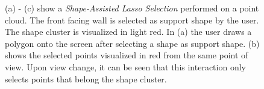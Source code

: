 \begin{figure}
\centering
{}\par\medskip
{}\par\medskip        
{}
\caption[Screenshots of the workflow of a Shape-Assisted Lasso Selection. (a) shows the lasso and the support shape, (b) the selected points, (c) shows that only points are selected on the support shape.]
{(a) - (c) show a \textit{Shape-Assisted Lasso Selection} performed on a point cloud. The front facing wall is selected as support shape by the user. The shape cluster is visualized in light red. In (a) the user draws a polygon onto the screen after selecting a shape as support shape. (b) shows the selected points visualized in red from the same point of view. Upon view change, it can be seen that this interaction only selects points that belong the shape cluster. }
\label{fig:lasso_assisted}
\end{figure}


